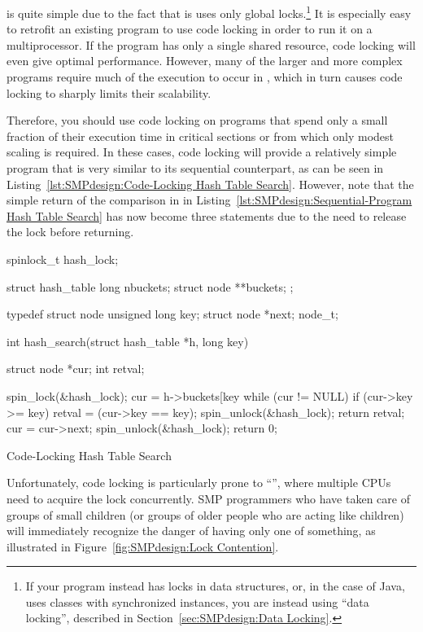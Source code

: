  is quite simple due to the fact that is uses only
global locks.\footnote{
	If your program instead has locks in data structures,
	or, in the case of Java, uses classes with synchronized
	instances, you are instead using ``data locking'', described
	in Section~\ref{sec:SMPdesign:Data Locking}.}
It is especially
easy to retrofit an existing program to use code locking in
order to run it on a multiprocessor.
If the program has only a single shared resource, code locking
will even give optimal performance.
However, many of the larger and more complex programs
require much of the execution to
occur in , which in turn causes code locking
to sharply limits their scalability.

Therefore, you should use code locking on programs that spend
only a small fraction of their execution time in critical sections or
from which only modest scaling is required.
In these cases, code locking will provide a relatively simple
program that is very similar to its sequential counterpart,
as can be seen in
Listing~\ref{lst:SMPdesign:Code-Locking Hash Table Search}.
However, note that the simple return of the comparison in
 in
Listing~\ref{lst:SMPdesign:Sequential-Program Hash Table Search}
has now become three statements due to the need to release the
lock before returning.

\begin{listing}
\begin{VerbatimL}[commandchars=\\\[\]]
spinlock_t hash_lock;

struct hash_table
{
	long nbuckets;
	struct node **buckets;
};

typedef struct node {
	unsigned long key;
	struct node *next;
} node_t;

int hash_search(struct hash_table *h, long key)
{
	struct node *cur;
	int retval;

	spin_lock(&hash_lock);
	cur = h->buckets[key %
	while (cur != NULL) {
		if (cur->key >= key) {
			retval = (cur->key == key);
			spin_unlock(&hash_lock);
			return retval;
		}
		cur = cur->next;
	}
	spin_unlock(&hash_lock);
	return 0;
}
\end{VerbatimL}
\caption{Code-Locking Hash Table Search}
\label{lst:SMPdesign:Code-Locking Hash Table Search}
\end{listing}

Unfortunately, code locking is particularly prone to ``'',
where multiple CPUs need to acquire the lock concurrently.
SMP programmers who have taken care of groups of small children
(or groups of older people who are acting like children) will immediately
recognize the danger of having only one of something,
as illustrated in Figure~\ref{fig:SMPdesign:Lock Contention}.

